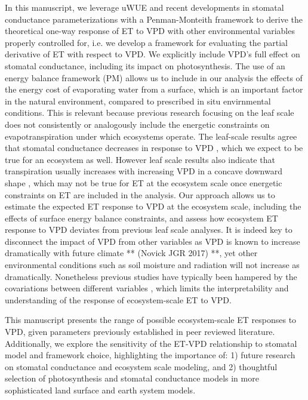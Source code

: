 In this manuscript, we leverage uWUE and recent developments in
stomatal conductance parameterizations \citep{MEDLYN_2011} with a
Penman-Monteith framework \citep [hereafter PM,][]{Penman_1948,
Monteith_1965} to derive the theoretical one-way response of ET to VPD
with other environmental variables properly controlled for, i.e. we
develop a framework for evaluating the partial derivative of ET with
respect to VPD. We explicitly include VPD's full effect on stomatal
conductance, including its impact on photosynthesis. The use of an
energy balance framework (PM) allows us to include in our analysis the
effects of the energy cost of evaporating water from a surface, which
is an important factor in the natural environment, compared to
prescribed in situ envirnmental conditions. This is relevant because
previous research focusing on the leaf scale \citep{Rawson1977,
Turner1984, Oren1999, Darmour2010, Mott2013} does not consistently or
analogously include the energetic constraints on evapotranspiration
under which ecosystems operate. The leaf-scale results agree that
stomatal conductance decreases in response to VPD \citep{Oren199,
Damour2010}, which we expect to be true for an ecosystem as
well. However leaf scale results also indicate that transpiration
usually increases with increasing VPD in a concave downward shape
\citep[e.g.,][]{Rawson1977, Turner1983, Mott2013}, which may not be
true for ET at the ecosystem scale once energetic constraints on ET
are included in the analysis. Our approach allows us to estimate the
expected ET response to VPD at the ecosystem scale, including the
effects of surface energy balance constraints, and assess how
ecosystem ET response to VPD deviates from previous leaf scale
analyses. It is indeed key to disconnect the impact of VPD from other
variables as VPD is known to increase dramatically with future climate
** (Novick JGR 2017) **, yet other environmental conditions such as
soil moisture and radiation will not increase as
dramatically. Nonetheless previous studies have typically been
hampered by the covariations between different variables
\citep[e.g. radiation and VPD or soil moisture and VPD, ][]{Lin_2018,
Zhou_2019}, which limits the interpretability and understanding of the
response of ecosystem-scale ET to VPD.

This manuscript presents the range of possible ecosystem-scale ET
responses to VPD, given parameters previously established in peer
reviewed literature. Additionally, we explore the sensitivity of the
ET-VPD relationship to stomatal model and framework choice,
highlighting the importance of: 1) future research on stomatal
conductance and ecosystem scale modeling, and 2) thoughtful selection
of photosynthesis and stomatal conductance models in more
sophisticated land surface and earth system models.
